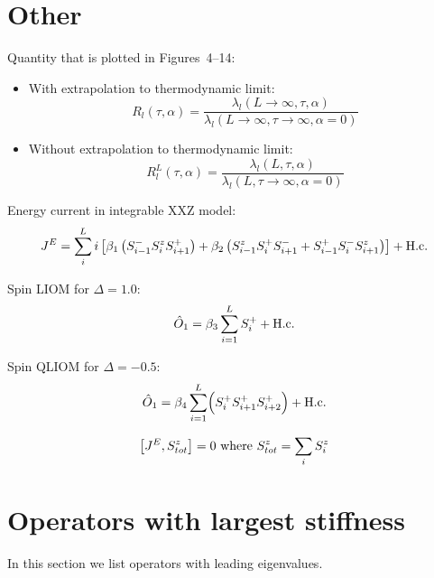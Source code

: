 \section{Other}

\noindent Quantity that is plotted in Figures~4--14:
\begin{itemize}
    \item 
    With extrapolation to thermodynamic limit:
    \begin{equation}
        R_l(\tau,\alpha) = \frac{\lambda_l(L\rightarrow \infty,\tau,\alpha)}
        {\lambda_l(L\rightarrow \infty,\tau \rightarrow \infty,\alpha=0)}
        \label{eq:R1 extrap}
    \end{equation}
    \item
    Without extrapolation to thermodynamic limit:
    \begin{equation}
        R^L_l(\tau,\alpha) = \frac{\lambda_l(L,\tau,\alpha)}
        {\lambda_l(L,\tau \rightarrow \infty,\alpha=0)}
        \label{eq:R1 no extrap}
    \end{equation}
\end{itemize}


\noindent Energy current in integrable XXZ model: 
\begin{align}
    J^E = \sum_i^L i\left[\beta_1 \left(S^{-}_{i-1}S^{z}_{i}S^{+}_{i+1}\right) + \beta_2 \left(S^{z}_{i-1}S^{+}_{i}S^{-}_{i+1}+S^{+}_{i-1}S^{-}_{i}S^{z}_{i+1}\right)\right] + \text{H.c.}
\end{align}


\noindent Spin LIOM for \(\Delta=1.0\):
\begin{equation}
    \hat{O}_{1} =  \beta_3\sum_{i=1}^{L} S^{+}_{i} + \text{H.c.}
\end{equation}

\noindent Spin QLIOM for \(\Delta=-0.5\):
\begin{equation}
    \hat{O}_{1} =\beta_4 \sum_{i=1}^{L} \Bigl( S^{+}_{i}S^{+}_{i+1}S^{+}_{i+2}\Bigr) + \text{H.c.}
\end{equation}

\begin{equation*}
    \comm{J^E}{\Sz_{tot}} = 0 \text{   where   } \Sz_{tot} = \sum_i \Sz_i
  \end{equation*}
  
  
\section{Operators with largest stiffness}

In this section we list operators with leading eigenvalues.\\

